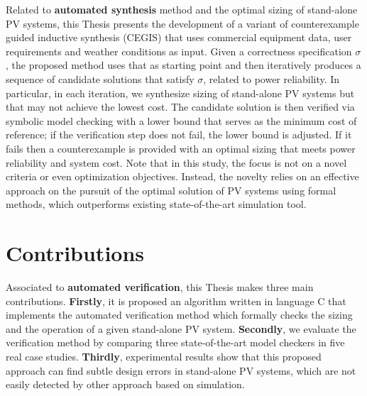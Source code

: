 Related to \textbf{automated synthesis} method and the optimal sizing of stand-alone PV systems, this Thesis presents the development of a variant of counterexample guided inductive synthesis (CEGIS) that uses commercial equipment data, user requirements and weather conditions as input. 
Given a correctness specification $\sigma$, the proposed method uses that as starting point 
and then iteratively produces a sequence of candidate solutions that satisfy $\sigma$, 
related to power reliability. In particular, in each iteration, we synthesize sizing of 
stand-alone PV systems but that may not achieve the lowest cost. The candidate solution 
is then verified via symbolic model checking with a lower bound that serves as the minimum 
cost of reference; if the verification step does not fail, the lower bound is adjusted. 
If it fails then a counterexample is provided with an optimal sizing that meets 
power reliability and system cost. Note that in this study, the focus is not on a novel criteria or even optimization objectives. Instead, the novelty relies on an effective approach on the pursuit of the optimal solution of PV systems using formal methods, which outperforms existing state-of-the-art simulation tool.


\section{Contributions}
Associated to \textbf{automated verification}, this Thesis makes three main contributions. %
\textbf{Firstly}, it is proposed an algorithm written in language C that implements the automated verification method which formally checks the sizing and the operation of a given stand-alone PV system. 
\textbf{Secondly}, we evaluate the verification method by comparing three state-of-the-art model checkers in five real case studies. 
\textbf{Thirdly}, experimental results show that this proposed approach can find subtle design errors in stand-alone PV systems, which are not easily detected by other approach based on simulation. 
%

